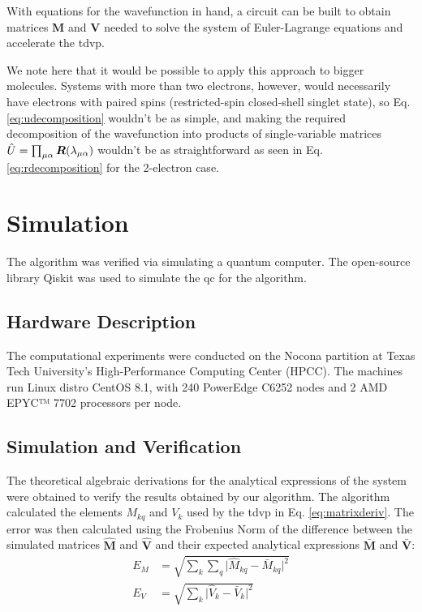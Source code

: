 \documentclass{aux/ttuthes2007}
\newcommand{\ind}[1]{{\uo #1 \oo #1}}
\newcommand{\uo}[1]{
		\IfEqCase{#1}{
			{0}{\mu}
			{1}{\nu}
			{2}{\xi}
		}[\PackageError{uo}{Undefined option to uo: #1}{}]
}
\newcommand{\oo}[1]{
		\IfEqCase{#1}{
			{0}{\alpha}
			{1}{\beta}
			{2}{\gamma}
		}[\PackageError{unocorb}{Undefined option to unuo: #1}{}]
}
\begin{document}
With equations for the wavefunction in hand, a circuit can be built to obtain matrices $\bm M$ and $\bm V$ needed to solve the system of Euler-Lagrange equations and accelerate the \gls{tdvp}. 

We note here that it would be possible to apply this approach to bigger molecules.
Systems with more than two electrons, however, would necessarily have electrons with paired spins (restricted-spin closed-shell singlet state), so Eq. \ref{eq:udecomposition} wouldn't be as simple, and making the required decomposition of the wavefunction into products of single-variable matrices $\hat U = \prod_{\ind 0} \bm R(\lambda_{\ind 0})$ wouldn't be as straightforward as seen in Eq. \ref{eq:rdecomposition} for the 2-electron case.

\section{\textbf{Simulation}}

The algorithm was verified via simulating a quantum computer. The open-source library Qiskit was used to simulate the \gls{qc} for the algorithm.

\subsection{\textbf{Hardware Description}}
The computational experiments were conducted on the Nocona partition at Texas Tech University's High-Performance Computing Center (HPCC). The machines run Linux distro CentOS 8.1, with 240 PowerEdge C6252 nodes and 2 AMD EPYC™ 7702 processors per node.
%

\subsection{\textbf{Simulation and Verification}}

The theoretical algebraic derivations for the analytical expressions of the system were obtained to verify the results obtained by our algorithm.
The algorithm calculated the elements $M_{kq}$ and $V_k$ used by the \gls{tdvp} in Eq. \ref{eq:matrixderiv}. The error was then calculated using the Frobenius Norm of the difference between the simulated matrices $\hat {\bm M}$ and $\hat {\bm V}$ and their expected analytical expressions $\bm {\bar M}$ and $\bm {\bar V}$:
%
\begin{equation*}
	\begin{split}
		E_M &= \sqrt{\sum_k \sum_q \lvert {\hat M_{kq} - \bar M_{kq}} \rvert ^ 2 }\\
		E_V &= \sqrt{\sum_k \lvert {\hat V_{k} - \bar V_{k}} \rvert ^ 2 }\\
	\end{split}
\end{equation*}
%
\end{document}

